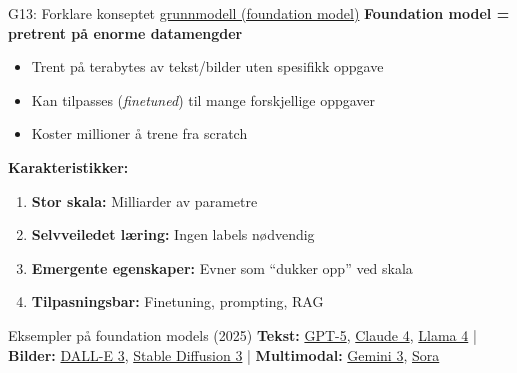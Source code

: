 \documentclass[aspectratio=169, 10pt]{beamer}
\begin{document}
\begin{frame}{G13: Forklare konseptet \href{https://en.wikipedia.org/wiki/Foundation_model}{grunnmodell (foundation model)}}
    \textbf{Foundation model = pretrent på enorme datamengder}
    \begin{itemize}
        \item Trent på terabytes av tekst/bilder uten spesifikk oppgave
        \item Kan tilpasses (\textit{finetuned}) til mange forskjellige oppgaver
        \item Koster millioner å trene fra scratch
    \end{itemize}

    \vspace{0.2cm}
    \textbf{Karakteristikker:}
    \begin{enumerate}
        \item \textbf{Stor skala:} Milliarder av parametre
        \item \textbf{Selvveiledet læring:} Ingen labels nødvendig
        \item \textbf{Emergente egenskaper:} Evner som ``dukker opp'' ved skala
        \item \textbf{Tilpasningsbar:} Finetuning, prompting, RAG
    \end{enumerate}

    \vspace{0.15cm}
    \begin{block}{\footnotesize Eksempler på foundation models (2025)}
        \scriptsize
        \textbf{Tekst:} \href{https://openai.com/gpt-5}{GPT-5}, \href{https://www.anthropic.com/claude}{Claude 4}, \href{https://llama.meta.com/}{Llama 4} |
        \textbf{Bilder:} \href{https://openai.com/dall-e-3}{DALL-E 3}, \href{https://stability.ai/}{Stable Diffusion 3} |
        \textbf{Multimodal:} \href{https://deepmind.google/gemini}{Gemini 3}, \href{https://openai.com/sora}{Sora}
    \end{block}
\end{frame}
\end{document}
